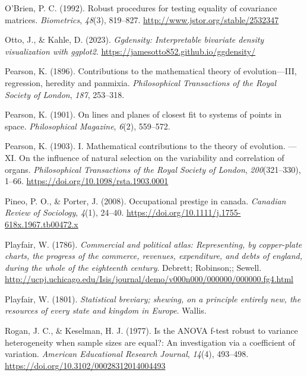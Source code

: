 \documentclass[
  letterpaper,
  10pt,
  krantz2]{krantz}
\newlength{\cslhangindent}
\newlength{\cslentryspacingunit} %
\newenvironment{CSLReferences}[2] %
 {%
  \setlength{\parindent}{0pt}
  \ifodd #1
  \let\oldpar\par
  \def\par{\hangindent=\cslhangindent\oldpar}
  \fi
  \setlength{\parskip}{#2\cslentryspacingunit}
 }%
 {}
\begin{document}
\begin{CSLReferences}{1}{0}
\leavevmode{}%
O'Brien, P. C. (1992). Robust procedures for testing equality of
covariance matrices. \emph{Biometrics}, \emph{48}(3), 819--827.
\url{http://www.jstor.org/stable/2532347}

\leavevmode{}%
Otto, J., \& Kahle, D. (2023). \emph{Ggdensity: Interpretable bivariate
density visualization with ggplot2}.
\url{https://jamesotto852.github.io/ggdensity/}

\leavevmode{}%
Pearson, K. (1896). Contributions to the mathematical theory of
evolution---{III}, regression, heredity and panmixia.
\emph{Philosophical Transactions of the Royal Society of London},
\emph{187}, 253--318.

\leavevmode{}%
Pearson, K. (1901). On lines and planes of closest fit to systems of
points in space. \emph{Philosophical Magazine}, \emph{6}(2), 559--572.

\leavevmode{}%
Pearson, K. (1903). I. Mathematical contributions to the theory of
evolution. ---XI. On the influence of natural selection on the
variability and correlation of organs. \emph{Philosophical Transactions
of the Royal Society of London}, \emph{200}(321--330), 1--66.
\url{https://doi.org/10.1098/rsta.1903.0001}

\leavevmode{}%
Pineo, P. O., \& Porter, J. (2008). Occupational prestige in canada.
\emph{Canadian Review of Sociology}, \emph{4}(1), 24--40.
\url{https://doi.org/10.1111/j.1755-618x.1967.tb00472.x}

\leavevmode{}%
Playfair, W. (1786). \emph{Commercial and political atlas: Representing,
by copper-plate charts, the progress of the commerce, revenues,
expenditure, and debts of england, during the whole of the eighteenth
century}. Debrett; Robinson;; Sewell.
\url{http://ucpj.uchicago.edu/Isis/journal/demo/v000n000/000000/000000.fg4.html}

\leavevmode{}%
Playfair, W. (1801). \emph{Statistical breviary; shewing, on a principle
entirely new, the resources of every state and kingdom in {Europe}}.
Wallis.

\leavevmode{}%
Rogan, J. C., \& Keselman, H. J. (1977). Is the {ANOVA} f-test robust to
variance heterogeneity when sample sizes are equal?: An investigation
via a coefficient of variation. \emph{American Educational Research
Journal}, \emph{14}(4), 493--498.
\url{https://doi.org/10.3102/00028312014004493}


\end{CSLReferences}
\end{document}
